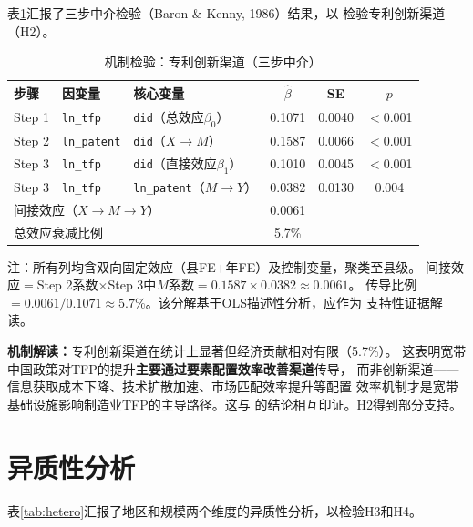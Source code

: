 \documentclass[12pt, a4paper]{article}
\begin{document}
表\ref{tab:mechanism}汇报了三步中介检验（Baron \& Kenny, 1986）结果，以
检验专利创新渠道（H2）。

\begin{table}[htbp]
\centering
\caption{机制检验：专利创新渠道（三步中介）}
\label{tab:mechanism}
\begin{threeparttable}
\begin{tabular}{lllccc}
\toprule
步骤 & 因变量 & 核心变量 & $\hat\beta$ & SE & $p$ \\
\midrule
Step 1 & \texttt{ln\_tfp} & \texttt{did}（总效应$\beta_0$） & 0.1071 & 0.0040 & $<$0.001 \\
Step 2 & \texttt{ln\_patent} & \texttt{did}（$X\to M$） & 0.1587 & 0.0066 & $<$0.001 \\
Step 3 & \texttt{ln\_tfp} & \texttt{did}（直接效应$\beta_1$） & 0.1010 & 0.0045 & $<$0.001 \\
Step 3 & \texttt{ln\_tfp} & \texttt{ln\_patent}（$M\to Y$） & 0.0382 & 0.0130 & 0.004 \\
\midrule
\multicolumn{3}{l}{间接效应（$X\to M\to Y$）} & 0.0061 & & \\
\multicolumn{3}{l}{总效应衰减比例} & 5.7\% & & \\
\bottomrule
\end{tabular}
\begin{tablenotes}\small
\item 注：所有列均含双向固定效应（县FE$+$年FE）及控制变量，聚类至县级。
  间接效应$=$Step 2系数$\times$Step 3中$M$系数$=0.1587\times0.0382\approx0.0061$。
  传导比例$=0.0061/0.1071\approx5.7\%$。该分解基于OLS描述性分析，应作为
  支持性证据解读。
\end{tablenotes}
\end{threeparttable}
\end{table}

\textbf{机制解读：}专利创新渠道在统计上显著但经济贡献相对有限（5.7\%）。
这表明宽带中国政策对TFP的提升\textbf{主要通过要素配置效率改善渠道}传导，
而非创新渠道——信息获取成本下降、技术扩散加速、市场匹配效率提升等配置
效率机制才是宽带基础设施影响制造业TFP的主导路径。这与
\citet{liang2024broadband}的结论相互印证。H2得到部分支持。

\section{异质性分析}

表\ref{tab:hetero}汇报了地区和规模两个维度的异质性分析，以检验H3和H4。
\end{document}
